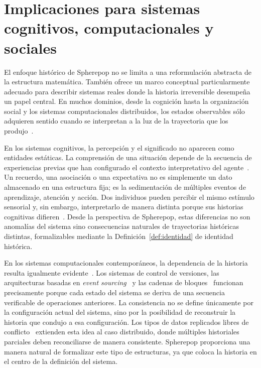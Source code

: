 \documentclass[12pt]{article}
\theoremstyle{plain}
\theoremstyle{definition}
\begin{document}
\section{Implicaciones para sistemas cognitivos, computacionales y sociales}
\label{sec:implicaciones}

El enfoque histórico de Spherepop no se limita a una reformulación abstracta de la estructura matemática. También ofrece un marco conceptual particularmente adecuado para describir sistemas reales donde la historia irreversible desempeña un papel central. En muchos dominios, desde la cognición hasta la organización social y los sistemas computacionales distribuidos, los estados observables sólo adquieren sentido cuando se interpretan a la luz de la trayectoria que los produjo~\cite{prigogine,heidegger,kleppmann}.

En los sistemas cognitivos, la percepción y el significado no aparecen como entidades estáticas. La comprensión de una situación depende de la secuencia de experiencias previas que han configurado el contexto interpretativo del agente~\cite{searle,fodor}. Un recuerdo, una asociación o una expectativa no es simplemente un dato almacenado en una estructura fija; es la sedimentación de múltiples eventos de aprendizaje, atención y acción. Dos individuos pueden percibir el mismo estímulo sensorial y, sin embargo, interpretarlo de manera distinta porque sus historias cognitivas difieren~\cite{goffman}. Desde la perspectiva de Spherepop, estas diferencias no son anomalías del sistema sino consecuencias naturales de trayectorias históricas distintas, formalizables mediante la Definición~\ref{def:identidad} de identidad histórica.

En los sistemas computacionales contemporáneos, la dependencia de la historia resulta igualmente evidente~\cite{lamport,kleppmann}. Los sistemas de control de versiones, las arquitecturas basadas en \emph{event sourcing}~\cite{fowler} y las cadenas de bloques~\cite{nakamoto} funcionan precisamente porque cada estado del sistema se deriva de una secuencia verificable de operaciones anteriores. La consistencia no se define únicamente por la configuración actual del sistema, sino por la posibilidad de reconstruir la historia que condujo a esa configuración. Los tipos de datos replicados libres de conflicto~\cite{shapiro} extienden esta idea al caso distribuido, donde múltiples historiales parciales deben reconciliarse de manera consistente. Spherepop proporciona una manera natural de formalizar este tipo de estructuras, ya que coloca la historia en el centro de la definición del sistema.
\end{document}
